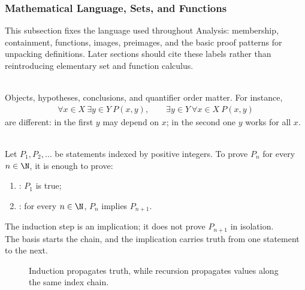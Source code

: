 \subsubsection{Mathematical Language, Sets, and Functions}


This subsection fixes the language used throughout Analysis: membership, containment, functions, images, preimages, and the basic proof patterns for unpacking definitions. Later sections should cite these labels rather than reintroducing elementary set and function calculus.

\begin{principle} \label{princ:analysis-language-as-structure} \\
Objects, hypotheses, conclusions, and quantifier order matter. For instance,
\begin{align}
\forall x\in X\ \exists y\in Y\ P(x,y), \qquad
\exists y\in Y\ \forall x\in X\ P(x,y) \nonumber
\end{align}
are different: in the first $y$ may depend on $x$; in the second one $y$ works for all $x$.
\end{principle}

\begin{principle} \label{princ:mathematical-induction} \\
Let $P_1,P_2,\ldots$ be statements indexed by positive integers. To prove $P_n$ for every $n\in\N$, it is enough to prove:
\begin{enumerate}[label=(\roman*)]
\setlength{\itemsep}{0pt}
\item {}: $P_1$ is true;
\item {}: for every $n\in\N$, $P_n$ implies $P_{n+1}$.
\end{enumerate}
The induction step is an implication; it does not prove $P_{n+1}$ in isolation.\\
The basis starts the chain, and the implication carries truth from one statement to the next.
\end{principle}

\begin{figure}[H]
  \centering
  
  \caption{Induction propagates truth, while recursion propagates values along the same index chain.}
  \label{fig:peano-recursion-induction-ladder}
\end{figure}

